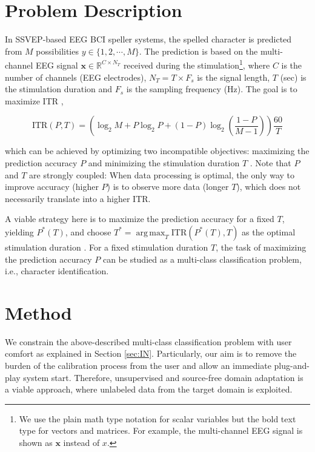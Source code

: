 \documentclass[12pt]{iopart}
\DeclareMathOperator*{\argmax}{arg\,max}
\newcommand{\matr}[1]{\mathbf{#1}}
\begin{document}
\section{Problem Description}
In SSVEP-based EEG BCI speller systems, the spelled character is predicted from $M$ possibilities $y \in \{1,2,\cdots,M\}$. The prediction is based on the multi-channel EEG signal $\matr{x}\in\mathbb{R}^{C\times N_T}$ received during the stimulation\footnote{We use the plain math type notation for scalar variables but the bold text type for vectors and matrices. For example, the multi-channel EEG signal is shown as $\matr{x}$ instead of $x$.}, where $C$ is the number of channels (EEG electrodes), $N_T=T\times F_s$ is the signal length, $T$ (sec) is the stimulation duration and $F_s$ is the sampling frequency (Hz). The goal is to maximize ITR \cite{itr_cite}, 

\begingroup
\begin{equation*}
    \text{ITR}(P,T) = \left( \log_{2} M + P\log_{2} P + (1-P)\log_{2} \left( \frac{1-P}{M-1} \right) \right) \frac{60}{T}
\end{equation*}
\endgroup

\noindent \noindent 
which can be achieved by optimizing two incompatible objectives: maximizing the prediction accuracy $P$ and minimizing the stimulation duration $T$ \cite{ournetwork}. Note that $P$ and $T$ are strongly coupled: When data processing is optimal, the only way to improve accuracy (higher $P$) is to observe more data (longer $T$), which does not necessarily translate into a higher ITR.  

A viable strategy here is to maximize the prediction accuracy for a fixed $T$, yielding $P^*(T)$, and choose $T^*=\argmax_{T} \text{ITR}(P^*(T),T)$ as the optimal stimulation duration \cite{ournetwork}. For a fixed stimulation duration $T$, the task of maximizing the prediction accuracy $P$ can be studied as a multi-class classification problem, i.e., character identification.



\section{Method}  \label{sec:methodology}

We constrain the above-described multi-class classification problem with user comfort as explained in Section \ref{sec:IN}. Particularly, our aim is to remove the burden of the calibration process from the user and allow an immediate plug-and-play system start. Therefore, unsupervised and source-free domain adaptation is a viable approach,  where unlabeled data from the target domain is exploited.  
\end{document}
